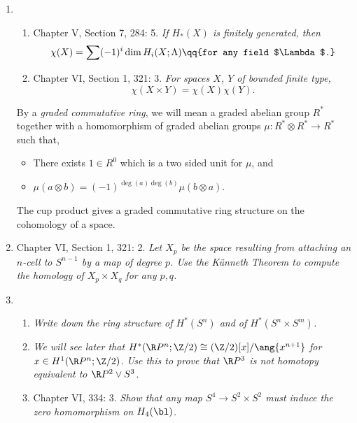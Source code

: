 \documentclass[onesided]{ccg-pset}
\author{Colton Grainger}
\date{\today}
\begin{document}
\maketitle

\begin{enumerate}
\item 
    \begin{enumerate}
        \item Chapter V, Section 7, 284: 5. \textit{If $H_*(X)$ is finitely generated, then 
            \[
                \chi(X) = \sum (-1)^i \dim H_i(X; \Lambda) \qq{for any field $\Lambda$.}
           \]}
       \item Chapter VI, Section 1, 321: 3. \textit{For spaces $X$, $Y$ of bounded finite type, 
           \[
               \chi(X \times Y) = \chi(X)\chi(Y).
           \]}
    \end{enumerate}

\newpage

 \begin{note}
    By a \emph{graded commutative ring}, we will mean a graded abelian group $R^*$ together with a homomorphism of graded abelian groups $\mu \colon R^* \otimes R^* \to R^*$ such that,
    \begin{itemize}
       \item There exists $1 \in R^0$ which is a two sided unit for $\mu$, and
       \item $\mu (a\otimes b) = (-1)^{\deg(a)\deg(b)} \mu(b\otimes a)$.
    \end{itemize}
    The cup product gives a graded commutative ring structure on the cohomology of a space. 
\end{note}

\item Chapter VI, Section 1, 321: 2. 
    \textit{Let $X_p$ be the space resulting from attaching an $n$-cell to $S^{n-1}$ by a map of degree $p$. Use the Künneth Theorem to compute the homology of $X_p \times X_q$ for any $p, q$.}


\newpage

\item 
    \begin{enumerate}
        \item \textit{Write down the ring structure of $H^*(S^n)$ and of $H^*(S^n \times S^m)$.}        
        \item \textit{We will see later that $H^*(\R P^n ; \Z/2) \cong (\Z/2)[x]/\ang{ x^{n+1} }$ for $x \in H^1(\R P^n ; \Z/2)$. Use this to prove that $\R P^3$ is not homotopy equivalent to $\R P^2 \vee S^3$.}
        \item Chapter VI, 334: 3. \textit{Show that any map $S^4 \to S^2 \times S^2$ must induce the zero homomorphism on $H_4(\bl)$.}
\end{enumerate}


\end{enumerate}
\end{document}
